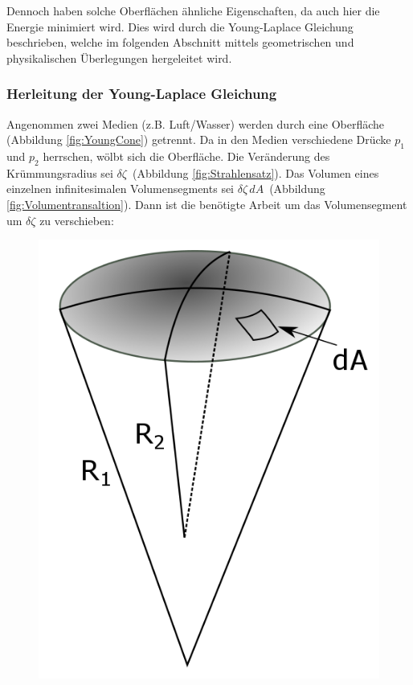 \begin{refsection}
Dennoch haben solche Oberflächen ähnliche Eigenschaften, da auch hier die Energie minimiert wird. Dies wird durch die Young-Laplace Gleichung \cite{minimal:Laplace} beschrieben, welche im folgenden Abschnitt mittels geometrischen und physikalischen Überlegungen hergeleitet wird.

\subsubsection{Herleitung der Young-Laplace Gleichung}\label{YL-Herleitung}
Angenommen zwei Medien (z.B. Luft/Wasser) werden durch eine Oberfläche \, (Abbildung \ref{fig:YoungCone}) getrennt. Da in den Medien verschiedene Drücke $p_1$ und $p_2$ herrschen, wölbt sich die Oberfläche. Die Veränderung des Krümmungsradius sei $\delta\zeta$ \,(Abbildung \ref{fig:Strahlensatz}). Das Volumen eines einzelnen infinitesimalen Volumensegments sei $\delta\zeta\,dA$ \,(Abbildung \ref{fig:Volumentransaltion}). Dann ist die benötigte Arbeit um das Volumensegment um $\delta\zeta$ zu verschieben:
\begin{figure}
  \centering
  \includegraphics[scale=0.3]{minimal/YoungCone.png}

\end{figure}
\end{refsection}
